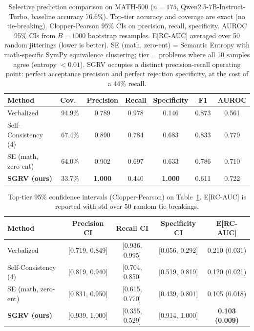 \documentclass{article}
\begin{document}
\begin{table}[t]
\centering
\caption{Selective prediction comparison on MATH-500 ($n=175$, Qwen2.5-7B-Instruct-Turbo, baseline accuracy 76.6\%). Top-tier accuracy and coverage are exact (no tie-breaking). Clopper-Pearson 95\% CIs on precision, recall, specificity. AUROC 95\% CIs from $B=1000$ bootstrap resamples. E[RC-AUC] averaged over 50 random jitterings (lower is better). SE (math, zero-ent) = Semantic Entropy \citep{kuhn2023semantic} with math-specific SymPy equivalence clustering; tier = problems where all 10 samples agree (entropy $< 0.01$). SGRV occupies a distinct precision-recall operating point: perfect acceptance precision and perfect rejection specificity, at the cost of a 44\% recall.}
\label{tab:selective}
\small
\begin{tabular}{lcccccc}
\toprule
Method & Cov.\ & Precision & Recall & Specificity & F1 & AUROC \\
\midrule
Verbalized          & 94.9\% & 0.789 & 0.978 & 0.146 & 0.873 & 0.561 \\
Self-Consistency (4) & 67.4\% & 0.890 & 0.784 & 0.683 & 0.833 & 0.779 \\
SE (math, zero-ent)  & 64.0\% & 0.902 & 0.697 & 0.633 & 0.786 & 0.710 \\
\textbf{SGRV (ours)} & 33.7\% & \textbf{1.000} & 0.440 & \textbf{1.000} & 0.611 & 0.722 \\
\bottomrule
\end{tabular}
\end{table}

\begin{table}[t]
\centering
\caption{Top-tier 95\% confidence intervals (Clopper-Pearson) on Table~\ref{tab:selective}. E[RC-AUC] is reported with std over 50 random tie-breakings.}
\label{tab:selective_ci}
\small
\begin{tabular}{lcccc}
\toprule
Method & Precision CI & Recall CI & Specificity CI & E[RC-AUC] \\
\midrule
Verbalized          & [0.719, 0.849] & [0.936, 0.995] & [0.056, 0.292] & 0.210 (0.031) \\
Self-Consistency (4) & [0.819, 0.940] & [0.704, 0.850] & [0.519, 0.819] & 0.120 (0.021) \\
SE (math, zero-ent)  & [0.831, 0.950] & [0.615, 0.770] & [0.439, 0.801] & 0.105 (0.018) \\
\textbf{SGRV (ours)} & [0.939, 1.000] & [0.355, 0.529] & [0.914, 1.000] & \textbf{0.103 (0.009)} \\
\bottomrule
\end{tabular}
\end{table}
\end{document}
